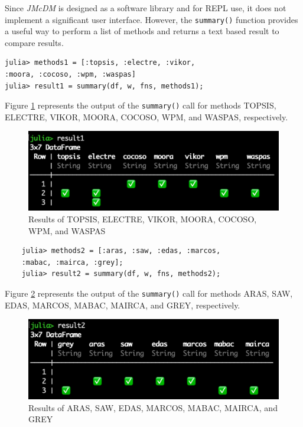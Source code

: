 \documentclass[preprint,review, 12pt, a4paper]{elsarticle}
\begin{document}
Since \emph{JMcDM} is designed as a software library and for REPL use, it does not implement
a significant user interface. However, the \texttt{summary()} function provides a useful way
to perform a list of methods and returns a text based result to compare results. 

\begin{verbatim}
julia> methods1 = [:topsis, :electre, :vikor, 
:moora, :cocoso, :wpm, :waspas]
julia> result1 = summary(df, w, fns, methods1);
\end{verbatim}

Figure \ref{fig:imagea} represents the output of the \texttt{summary()} call for methods TOPSIS, ELECTRE, VIKOR, MOORA, COCOSO, WPM,  and WASPAS, respectively.

\begin{figure}
	\includegraphics[width=\columnwidth]{images/result1}
	\caption{Results of TOPSIS, ELECTRE, VIKOR, MOORA, COCOSO, WPM, and WASPAS}
	\label{fig:imagea}
	\end{figure}

\begin{verbatim}
	julia> methods2 = [:aras, :saw, :edas, :marcos, 
	:mabac, :mairca, :grey];
	julia> result2 = summary(df, w, fns, methods2);
\end{verbatim}

Figure \ref{fig:imageb} represents the output of the \texttt{summary()} call for methods ARAS, SAW, EDAS, MARCOS, MABAC, MAIRCA, and GREY, respectively.


	\begin{figure}
		\includegraphics[width=\columnwidth]{images/result2}
		\caption{Results of ARAS, SAW, EDAS, MARCOS, MABAC, MAIRCA, and GREY}
		\label{fig:imageb}
		\end{figure}
\end{document}
